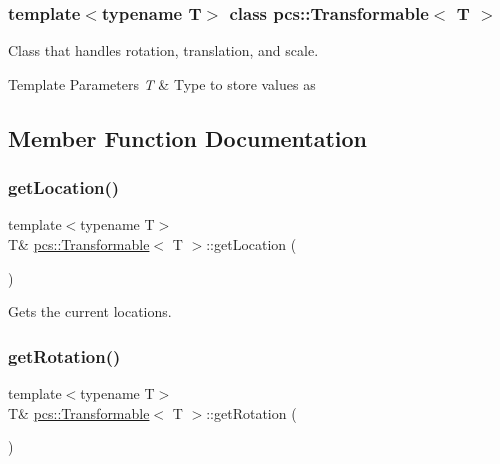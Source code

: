 \subsubsection*{template$<$typename T$>$\newline
class pcs\+::\+Transformable$<$ T $>$}

Class that handles rotation, translation, and scale. 


\begin{DoxyTemplParams}{Template Parameters}
{\em T} & Type to store values as \\
\hline
\end{DoxyTemplParams}


\subsection{Member Function Documentation}
\mbox{\label{classpcs_1_1Transformable_ae335d66eb0d036c8e62058536fda86dd}} 
\subsubsection{\texorpdfstring{get\+Location()}{getLocation()}}
{\footnotesize\ttfamily template$<$typename T$>$ \\
T\& \hyperlink{classpcs_1_1Transformable}{pcs\+::\+Transformable}$<$ T $>$\+::get\+Location (\begin{DoxyParamCaption}{ }\end{DoxyParamCaption})\hspace{0.3cm}{\ttfamily [inline]}}



Gets the current locations. 

\mbox{\label{classpcs_1_1Transformable_a499e12e4561a18c9c09c8140f015e974}} 
\subsubsection{\texorpdfstring{get\+Rotation()}{getRotation()}}
{\footnotesize\ttfamily template$<$typename T$>$ \\
T\& \hyperlink{classpcs_1_1Transformable}{pcs\+::\+Transformable}$<$ T $>$\+::get\+Rotation (\begin{DoxyParamCaption}{ }\end{DoxyParamCaption})\hspace{0.3cm}{\ttfamily [inline]}}



